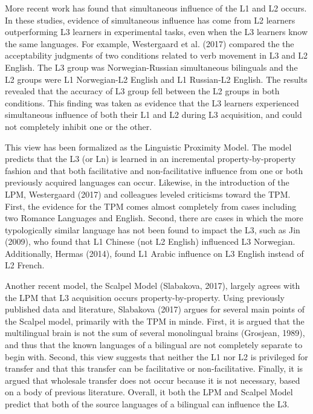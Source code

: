 \documentclass[
  man]{apa6}
\begin{document}
More recent work has found that simultaneous influence of the L1 and L2 occurs.
In these studies, evidence of simultaneous influence has come from L2 learners outperforming L3 learners in experimental tasks, even when the L3 learners know the same languages.
For example, Westergaard et al. (2017) compared the the acceptability judgments of two conditions related to verb movement in L3 and L2 English.
The L3 group was Norwegian-Russian simultaneous bilinguals and the L2 groups were L1 Norwegian-L2 English and L1 Russian-L2 English.
The results revealed that the accuracy of L3 group fell between the L2 groups in both conditions.
This finding was taken as evidence that the L3 learners experienced simultaneous influence of both their L1 and L2 during L3 acquisition, and could not completely inhibit one or the other.

This view has been formalized as the Linguistic Proximity Model.
The model predicts that the L3 (or Ln) is learned in an incremental property-by-property fashion and that both facilitative and non-facilitative influence from one or both previously acquired languages can occur.
Likewise, in the introduction of the LPM, Westergaard (2017) and colleagues leveled criticisms toward the TPM.
First, the evidence for the TPM comes almost completely from cases including two Romance Languages and English.
Second, there are cases in which the more typologically similar language has not been found to impact the L3, such as Jin (2009), who found that L1 Chinese (not L2 English) influenced L3 Norwegian.
Additionally, Hermas (2014), found L1 Arabic influence on L3 English instead of L2 French.

Another recent model, the Scalpel Model (Slabakova, 2017), largely agrees with the LPM that L3 acquisition occurs property-by-property.
Using previously published data and literature, Slabakova (2017) argues for several main points of the Scalpel model, primarily with the TPM in minde.
First, it is argued that the multilingual brain is not the sum of several monolingual brains (Grosjean, 1989), and thus that the known languages of a bilingual are not completely separate to begin with.
Second, this view suggests that neither the L1 nor L2 is privileged for transfer and that this transfer can be facilitative or non-facilitative.
Finally, it is argued that wholesale transfer does not occur because it is not necessary, based on a body of previous literature.
Overall, it both the LPM and Scalpel Model predict that both of the source languages of a bilingual can influence the L3.
\end{document}
